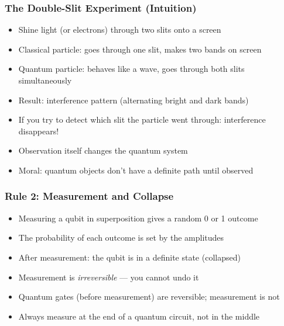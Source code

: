 \begin{frame}[fragile]\frametitle{The Double-Slit Experiment (Intuition)}
\begin{itemize}
\item Shine light (or electrons) through two slits onto a screen
\item Classical particle: goes through one slit, makes two bands on screen
\item Quantum particle: behaves like a wave, goes through both slits simultaneously
\item Result: interference pattern (alternating bright and dark bands)
\item If you try to detect which slit the particle went through: interference disappears!
\item Observation itself changes the quantum system
\item Moral: quantum objects don't have a definite path until observed
\end{itemize}
\end{frame}

\begin{frame}[fragile]\frametitle{Rule 2: Measurement and Collapse}
\begin{itemize}
\item Measuring a qubit in superposition gives a random 0 or 1 outcome
\item The probability of each outcome is set by the amplitudes
\item After measurement: the qubit is in a definite state (collapsed)
\item Measurement is \textit{irreversible} --- you cannot undo it
\item Quantum gates (before measurement) are reversible; measurement is not
\item Always measure at the end of a quantum circuit, not in the middle
\end{itemize}
\end{frame}

